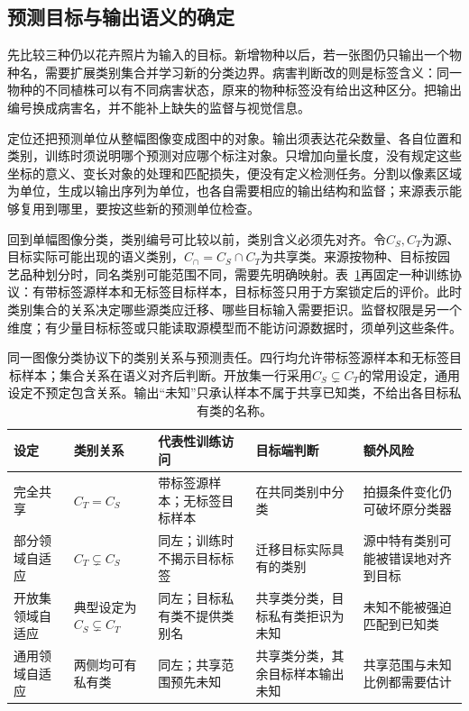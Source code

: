 \subsection{预测目标与输出语义的确定}
\label{sec:ket-transfer-output-semantics}

先比较三种仍以花卉照片为输入的目标。新增物种以后，若一张图仍只输出一个物种名，需要扩展类别集合并学习新的分类边界。病害判断改的则是标签含义：同一物种的不同植株可以有不同病害状态，原来的物种标签没有给出这种区分。把输出编号换成病害名，并不能补上缺失的监督与视觉信息。

定位还把预测单位从整幅图像变成图中的对象。输出须表达花朵数量、各自位置和类别，训练时须说明哪个预测对应哪个标注对象。只增加向量长度，没有规定这些坐标的意义、变长对象的处理和匹配损失，便没有定义检测任务。分割以像素区域为单位，生成以输出序列为单位，也各自需要相应的输出结构和监督；来源表示能够复用到哪里，要按这些新的预测单位检查。

回到单幅图像分类，类别编号可比较以前，类别含义必须先对齐。令$C_S,C_T$为源、目标实际可能出现的语义类别，$C_{\cap}=C_S\cap C_T$为共享类。来源按物种、目标按园艺品种划分时，同名类别可能范围不同，需要先明确映射。表~\ref{tab:ket-transfer-class-relations}再固定一种训练协议：有带标签源样本和无标签目标样本，目标标签只用于方案锁定后的评价。此时类别集合的关系决定哪些源类应迁移、哪些目标输入需要拒识。监督权限是另一个维度；有少量目标标签或只能读取源模型而不能访问源数据时，须单列这些条件。

\begin{table}[htbp]
  \centering
  \small
  \setlength{\tabcolsep}{3pt}
  \begin{tabularx}{\linewidth}{p{19mm}p{25mm}p{29mm}XX}
    \toprule
    设定 & 类别关系 & 代表性训练访问 & 目标端判断 & 额外风险 \\
    \midrule
    完全共享 & $C_T=C_S$ & 带标签源样本；无标签目标样本 & 在共同类别中分类 & 拍摄条件变化仍可破坏原分类器 \\
    部分领域自适应 & $C_T\subsetneq C_S$ & 同左；训练时不揭示目标标签 & 迁移目标实际具有的类别 & 源中特有类别可能被错误地对齐到目标 \\
    开放集领域自适应 & 典型设定为$C_S\subsetneq C_T$ & 同左；目标私有类不提供类别名 & 共享类分类，目标私有类拒识为未知 & 未知不能被强迫匹配到已知类 \\
    通用领域自适应 & 两侧均可有私有类 & 同左；共享范围预先未知 & 共享类分类，其余目标样本输出未知 & 共享范围与未知比例都需要估计 \\
    \bottomrule
  \end{tabularx}
  \caption{同一图像分类协议下的类别关系与预测责任。四行均允许带标签源样本和无标签目标样本；集合关系在语义对齐后判断。开放集一行采用$C_S\subsetneq C_T$的常用设定，通用设定不预定包含关系。输出“未知”只承认样本不属于共享已知类，不给出各目标私有类的名称。}
  \label{tab:ket-transfer-class-relations}
\end{table}

